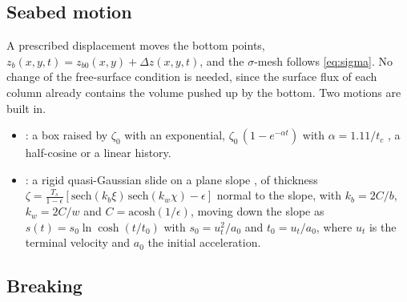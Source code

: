 \subsection{Seabed motion}
\label{sec:bottommotion}

A prescribed displacement moves the bottom points,
$z_b(x,y,t) = z_{b0}(x,y) + \Delta z(x,y,t)$, and the $\sigma$-mesh follows
\eqref{eq:sigma}. No change of the free-surface condition is needed, since the
surface flux of each column already contains the volume pushed up by the
bottom. Two motions are built in.
\begin{itemize}[nosep]
  \item {}: a box raised by $\zeta_0$ with an exponential,
        $\zeta_0\,(1-e^{-\alpha t})$ with $\alpha = 1.11/t_c$
        \citep{hammack1973}, a half-cosine or a linear history.
  \item {}: a rigid quasi-Gaussian slide on a plane slope
        \citep{grilli2005,enet2007}, of thickness
        $\zeta = \frac{T_s}{1-\epsilon}\left[\mathrm{sech}(k_b\xi)\,\mathrm{sech}(k_w\chi)-\epsilon\right]$
        normal to the slope, with $k_b = 2C/b$, $k_w = 2C/w$ and
        $C = \mathrm{acosh}(1/\epsilon)$, moving down the slope as
        $s(t) = s_0\ln\cosh(t/t_0)$ with $s_0 = u_t^2/a_0$ and
        $t_0 = u_t/a_0$, where $u_t$ is the terminal velocity and $a_0$ the
        initial acceleration.
\end{itemize}

\subsection{Breaking}
\label{sec:hfa}

